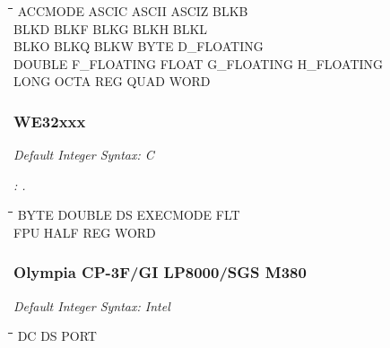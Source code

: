 {\tt\begin{tabbing}
\hspace{3cm}\=\hspace{3cm}\=\hspace{3cm}\=\hspace{3cm}\=\kill
ACCMODE     \> ASCIC       \> ASCII       \> ASCIZ        \> BLKB \\
BLKD        \> BLKF        \> BLKG        \> BLKH         \> BLKL \\
BLKO        \> BLKQ        \> BLKW        \> BYTE         \> D\_FLOATING \\
DOUBLE      \> F\_FLOATING \> FLOAT       \> G\_FLOATING  \> H\_FLOATING \\
LONG        \> OCTA        \> REG         \> QUAD         \> WORD \\
\end{tabbing}}

\subsubsection{WE32xxx}

{\em Default Integer Syntax: C}

{\em \pcsymname{}: . }

{\tt\begin{tabbing}
\hspace{3cm}\=\hspace{3cm}\=\hspace{3cm}\=\hspace{3cm}\=\kill
BYTE        \> DOUBLE      \> DS          \> EXECMODE    \> FLT \\
FPU         \> HALF        \> REG         \> WORD \\
\end{tabbing}}

\subsubsection{Olympia CP-3F/GI LP8000/SGS M380}

{\em Default Integer Syntax: Intel}

{\tt\begin{tabbing}
\hspace{3cm}\=\hspace{3cm}\=\hspace{3cm}\=\hspace{3cm}\=\kill   
DC         \> DS          \> PORT \\
\end{tabbing}}

